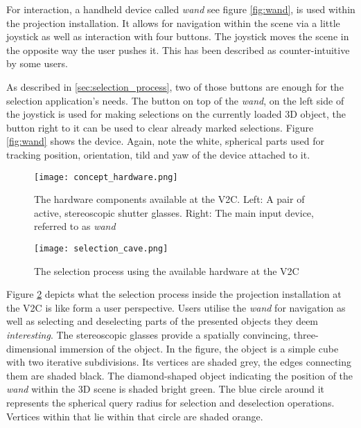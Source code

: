 For interaction, a handheld device called \textit{wand} see figure \ref{fig:wand}, is used within the projection installation. It allows for navigation within the scene via a little joystick as well as interaction with four buttons. The joystick moves the scene in the opposite way the user pushes it. This has been described as counter-intuitive by some users.

As described in \ref{sec:selection_process}, two of those buttons are enough for the selection application's needs. The button on top of the \textit{wand}, on the left side of the joystick is used for making selections on the currently loaded 3D object, the button  right to it can be used to clear already marked selections. Figure \ref{fig:wand} shows the device. Again, note the white, spherical parts used for tracking position, orientation, tild and yaw of the device attached to it.

\begin{figure}[htb]
  \centering
  \texttt{[image: concept\_hardware.png]}\\ %
  \caption{The hardware components available at the V2C. Left: A pair of active, stereoscopic shutter glasses. Right: The main input device, referred to as \textit{wand}}
  \label{fig:selection_cave}
\end{figure}

\begin{figure}[htb]
  \centering
  \texttt{[image: selection\_cave.png]}\\ %
  \caption{The selection process using the available hardware at the V2C}\label{fig:selection_cave}
\end{figure}

Figure \ref{fig:selection_cave} depicts what the selection process inside the projection installation at the V2C is like form a user perspective. Users utilise the \textit{wand} for navigation as well as selecting and deselecting parts of the presented objects they deem \textit{interesting}. The stereoscopic glasses provide a spatially convincing, three-dimensional immersion of the object. In the figure, the object is a simple cube with two iterative subdivisions. Its vertices are shaded grey, the edges connecting them are shaded black. The diamond-shaped object indicating the position of the \textit{wand} within the 3D scene is shaded bright green. The blue circle around it represents the spherical query radius for selection and deselection operations. Vertices within that lie within that circle are shaded orange.


